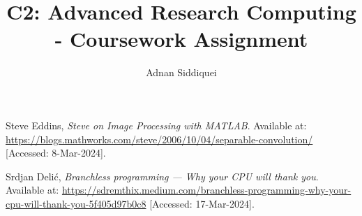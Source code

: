 \documentclass[a4paper,11pt]{article}
\title{\boldmath C2: Advanced Research Computing - Coursework Assignment}
\author{Adnan Siddiquei}
\affiliation{University of Cambridge}
\begin{document}
\maketitle
\flushbottom





% 
% 
% 



\begin{thebibliography}{99}

Steve Eddins,
\textit{Steve on Image Processing with MATLAB}.
Available at: \url{https://blogs.mathworks.com/steve/2006/10/04/separable-convolution/}
[Accessed: 8-Mar-2024].

Srdjan Delić,
\textit{Branchless programming — Why your CPU will thank you}.
Available at: \url{https://sdremthix.medium.com/branchless-programming-why-your-cpu-will-thank-you-5f405d97b0c8}
[Accessed: 17-Mar-2024].

\end{thebibliography}
\end{document}
